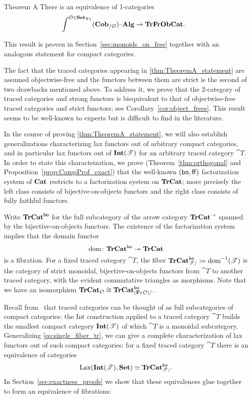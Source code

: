 \documentclass[11pt,oneside,article]{memoir}
\begin{document}
\begin{named}{Theorem A}
    \label{thm:TheoremA_statement}
  There is an equivalence of 1-categories
  \begin{align*}
    &\int^{\mathcal{O}\in\mathbf{Set}_{\mathbf{T}_{\mathsf{T}}}}(\mathbf{Cob}_{/\mathcal{O}}){\text \textendash}\mathbf{Alg} \to \mathbf{TrFrObCat}.
  \end{align*}
\end{named}
This result is proven in Section~\ref{sec:monoids_on_free} together with an analogous statement for compact categories. 

The fact that the traced categories appearing in \ref{thm:TheoremA_statement} are assumed objectwise-free and the functors between them are strict is the second of two drawbacks mentioned above. To address it, we prove that the 2-category of traced categories and
strong functors is biequivalent to that of objectwise-free traced categories and strict functors;
see Corollary~\ref{cor:object_frees}. This result seems to be well-known to experts but is difficult to find in the literature.

In the course of proving \ref{thm:TheoremA_statement}, we will also establish generalizations
characterizing lax functors out of arbitrary compact categories, and in particular lax functors out
of $\mathbf{Int}(\mathscr{T})$ for an arbitrary traced category $\cat{T}$. In order to state this
characteization, we prove (Theorem~\ref{thm:orthogonal} and Proposition~\ref{prop:CompProf_exact})
that the well-known $(\mathsf{bo},\mathsf{ff})$ factorization system of $\mathbf{Cat}$ restricts to a factorization system
on $\mathbf{TrCat}$; more precisely the left class consists of bijective-on-objects functors and the right
class consists of fully faithful functors.

Write $\mathbf{TrCat}^{\mathsf{bo}}$ for the full subcategory of the arrow category $\mathbf{TrCat}^{\to}$ spanned by the
bijective-on-objects functors. The existence of the factorization system implies that the domain
functor
\[
  \operatorname{dom}\colon\mathbf{TrCat}^{\mathsf{bo}}\twoheadrightarrow\mathbf{TrCat}
\]
is a fibration. For a fixed traced category $\cat{T}$, the fiber
$\mathbf{TrCat}^{\mathsf{bo}}_{\mathscr{T}/}\coloneqq\operatorname{dom}^{-1}(\mathscr{T})$ is the category of strict monoidal,
bijective-on-objects functors from $\cat{T}$ to another traced category, with the evident
commutative triangles as morphisms. Note that we have an isomorphism
$\mathbf{TrCat}_{\mathcal{O}}\cong\mathbf{TrCat}^{\mathsf{bo}}_{(\mathbf{F}_{\mathsf{T}}\mathcal{O})/}$.

Recall from~\cite{JoyalStreetVerity} that traced categories can be thought of as full subcategories
of compact categories: the Int construction applied to a traced category $\cat{T}$ builds the
smallest compact category $\mathbf{Int}(\mathscr{T})$ of which $\cat{T}$ is a monoidal subcategory. Generalizing
\eqref{eq:single_fiber_tr}, we can give a complete characterization of lax functors out of such
compact categories: for a fixed traced category $\cat{T}$ there is an equivalence of categories
\[
  \operatorname{Lax}(\mathbf{Int}(\mathscr{T}),\mathbf{Set})\simeq\mathbf{TrCat}^{\mathsf{bo}}_{\mathscr{T}/}.
\]
In Section~\ref{sec:exactness_proofs} we show that these equivalences glue together to form an
equivalence of fibrations:
\end{document}
